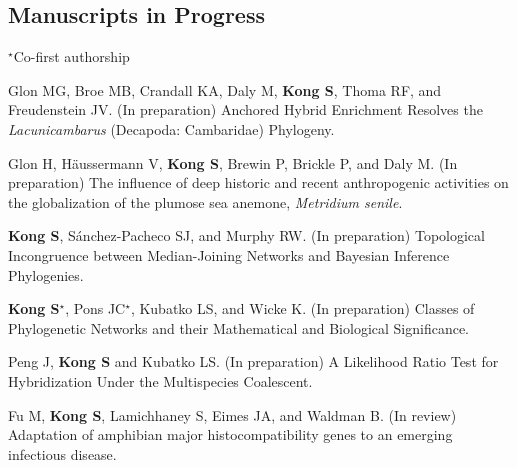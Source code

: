 \documentclass[11pt]{article}
\begin{document}
\subsection*{Manuscripts in Progress}
$^\star$Co-first authorship
\begin{etaremune}


	\item Glon MG, Broe MB, Crandall KA, Daly M, \textbf{Kong S}, Thoma RF, and Freudenstein JV. (In preparation) Anchored Hybrid Enrichment Resolves the \textit{Lacunicambarus} (Decapoda: Cambaridae) Phylogeny.
	\item Glon H, Häussermann V, \textbf{Kong S}, Brewin P, Brickle P, and Daly M. (In preparation) The influence of deep historic and recent anthropogenic activities on the globalization of the plumose sea anemone, \textit{Metridium senile}.
	\item \textbf{Kong S}, Sánchez-Pacheco SJ, and Murphy RW. (In preparation) Topological Incongruence between Median-Joining Networks and Bayesian Inference Phylogenies.
	\item \textbf{Kong S}$^\star$, Pons JC$^\star$, Kubatko LS, and Wicke K. (In preparation) Classes of Phylogenetic Networks and their Mathematical and Biological Significance.
	\item Peng J, \textbf{Kong S} and Kubatko LS. (In preparation) A Likelihood Ratio Test for Hybridization Under the Multispecies Coalescent.
	\item Fu M, \textbf{Kong S}, Lamichhaney S, Eimes JA, and Waldman B. (In review) Adaptation of amphibian major histocompatibility genes to an emerging infectious disease. 
\end{etaremune}
\end{document}
